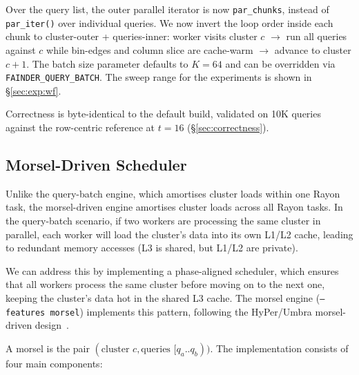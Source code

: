 Over the query list, the outer parallel iterator is now \texttt{par\_chunks}, instead of \texttt{par\_iter()} over individual queries. We now invert the loop order inside each chunk to cluster-outer + queries-inner: worker visits cluster $c$ $\to$ run all queries against $c$ while bin-edges and column slice are cache-warm $\to$ advance to cluster $c{+}1$. The batch size parameter defaults to $K{=}64$ and can be overridden via \texttt{FAINDER\_QUERY\_BATCH}. The sweep range for the experiments is shown in §\ref{sec:exp:wf}.

Correctness is byte-identical to the default build, validated on 10K queries against the row-centric reference at $t{=}16$ (§\ref{sec:correctness}).

\subsection{Morsel-Driven Scheduler\label{sec:method:impl:morsel}}

Unlike the query-batch engine, which amortises cluster loads within one Rayon task, the morsel-driven engine amortises cluster loads across all Rayon tasks. In the query-batch scenario, if two workers are processing the same cluster in parallel, each worker will load the cluster's data into its own L1/L2 cache, leading to redundant memory accesses (L3 is shared, but L1/L2 are private).

We can address this by implementing a phase-aligned scheduler, which ensures that all workers process the same cluster before moving on to the next one, keeping the cluster's data hot in the shared L3 cache. The morsel engine (\texttt{--features morsel}) implements this pattern, following the HyPer/Umbra morsel-driven design~\cite{leis_2014,bandle_2021}.


A morsel is the pair $(\text{cluster } c, \text{queries } [q_a..q_b))$. The implementation consists of four main components:

